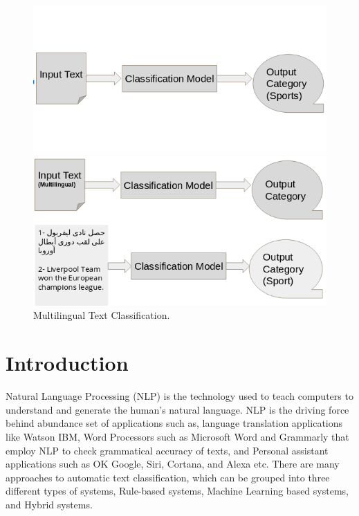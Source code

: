 \documentclass[letterpaper,12pt]{article}
\begin{document}
\begin{figure}
	\centering
	\begin{minipage}[b]{.4\textwidth}
		\centering \includegraphics[width=0.8\columnwidth]{sport.png}
		
		\caption{
			\label{fig:1} %
			Text Classification
		}
		
	\end{minipage}\qquad
	\begin{minipage}[b]{.4\textwidth}
		
		\centering \includegraphics[width=0.8\columnwidth]{2.png}
		
		\caption{
			\label{fig:2} %
			Multilingual Text Classification.
		}
		
	\end{minipage}
\end{figure}


\section{Introduction}
Natural Language Processing (NLP) is the technology used to teach computers to understand and generate the human’s natural language. NLP is the driving force behind abundance set of applications such as, language translation applications like Watson IBM, Word Processors such as Microsoft Word and Grammarly that employ NLP to check grammatical accuracy of texts, and 
Personal assistant applications such as OK Google, Siri, Cortana, and Alexa etc. There are many approaches to automatic text classification, which can be grouped into three different types of systems, Rule-based systems, Machine Learning based systems, and Hybrid systems. 
\end{document}
